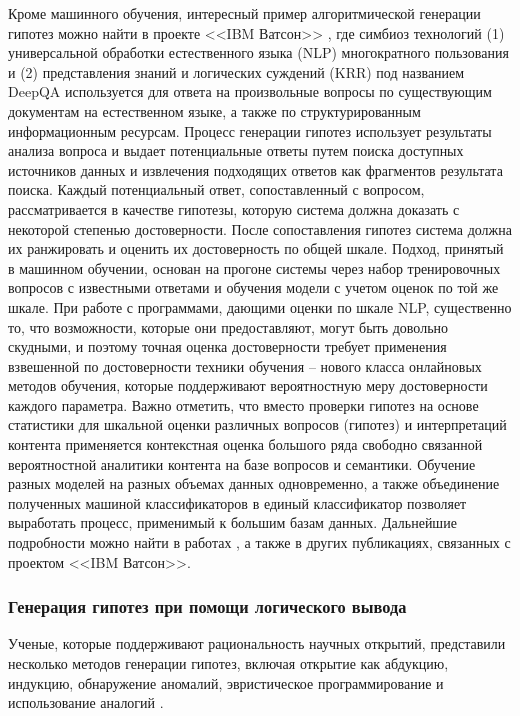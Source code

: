 Кроме машинного обучения, интересный пример алгоритмической генерации гипотез можно найти в проекте <<IBM Ватсон>> 
\cite{ferrucci2010building}, где симбиоз технологий (1) универсальной обработки естественного языка (NLP) многократного 
пользования и (2) представления знаний и логических суждений (KRR) под названием DeepQA используется для ответа на 
произвольные вопросы по существующим документам на естественном языке, а также по структурированным информационным 
ресурсам. Процесс генерации гипотез использует результаты анализа вопроса и выдает потенциальные ответы путем поиска 
доступных источников данных и извлечения подходящих ответов как фрагментов результата поиска. Каждый потенциальный 
ответ, сопоставленный с вопросом, рассматривается в качестве гипотезы, которую система должна доказать с некоторой 
степенью достоверности. После сопоставления гипотез система должна их ранжировать и оценить их достоверность по общей 
шкале. Подход, принятый в машинном обучении, основан на прогоне системы через набор тренировочных вопросов с известными 
ответами и обучения модели с учетом оценок по той же шкале. При работе с программами, дающими оценки по шкале NLP, 
существенно то, что возможности, которые они предоставляют, могут быть довольно скудными, и поэтому точная оценка 
достоверности требует применения взвешенной по достоверности техники обучения \cite{ferrucci2010building} – нового 
класса онлайновых методов обучения, которые поддерживают вероятностную меру достоверности каждого параметра. Важно 
отметить, что вместо проверки гипотез на основе статистики для шкальной оценки различных вопросов (гипотез) и 
интерпретаций контента применяется контекстная оценка большого ряда свободно связанной вероятностной аналитики контента 
на базе вопросов и семантики. Обучение разных моделей на разных объемах данных одновременно, а также объединение 
полученных машиной классификаторов в единый классификатор позволяет выработать процесс, применимый к большим базам 
данных. Дальнейшие подробности можно найти в работах \cite{ferrucci2010building, dredze2008confidence}, а также в 
других публикациях, связанных с проектом <<IBM Ватсон>>. 

\subsubsection{Генерация гипотез при помощи логического вывода}\label{sect1_2_5_2}
Ученые, которые поддерживают рациональность научных открытий, представили несколько методов генерации гипотез, включая 
открытие как абдукцию, индукцию, обнаружение аномалий, эвристическое программирование и использование 
аналогий \cite{Woodward2011}.

